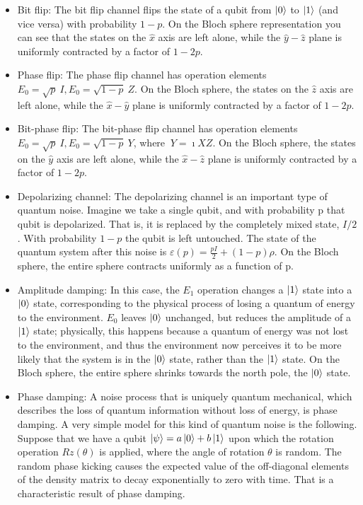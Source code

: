 \documentclass{article}
\begin{document}
	\begin{itemize}
        \item Bit ﬂip: The bit ﬂip channel ﬂips the state of a qubit from $\ket{0}$ to $\ket{1}$ (and vice versa) with probability $1 - p$. On the Bloch sphere representation you can see that the states on the $\hat{x}$ axis are left alone, while the $\hat{y}-\hat{z}$ plane is uniformly contracted by a factor of $1 - 2p$. 
        
        \item Phase flip: The phase ﬂip channel has operation elements $E_0 = \sqrt{p}\ I , E_0 = \sqrt{1 - p}\ Z $. On the Bloch sphere, the states on the $\hat{z}$ axis  are left alone, while the  $\hat{x}-\hat{y}$ plane is uniformly contracted by a factor of $1 - 2p$.

        \item Bit-phase flip: The bit-phase ﬂip channel has operation elements $E_0 = \sqrt{p}\ I , E_0 = \sqrt{1 - p}\ Y$, where $\ Y = \imath X Z $. On the Bloch sphere, the states on the $\hat{y}$  axis are left alone, while the $\hat{x}-\hat{z}$ plane is uniformly contracted by a factor of $1 - 2p$.

        \item Depolarizing channel: The depolarizing channel is an important type of quantum noise. Imagine we take a single qubit, and with probability p that qubit is depolarized. That is, it is replaced by the completely mixed state, $I/2$. With probability $1 - p$ the qubit is left untouched. The state of the quantum system after this noise is  $\varepsilon (p) = \frac{pI}{2} + (1- p)\rho$. On the Bloch sphere, the entire sphere contracts uniformly as a function of p. \cite{quantccompquantinfo}
        
        \item Amplitude damping: In this case, the $E_1$ operation changes a $\ket{1}$ state into a $\ket{0}$ state, corresponding to the physical process of losing a quantum of energy to the environment. $E_0$ leaves $\ket{0}$ unchanged, but reduces the amplitude of a $\ket{1}$ state; physically, this happens because a quantum of energy was not lost to the environment, and thus the environment now perceives it to be more likely that the system is in the $\ket{0}$ state, rather than the $\ket{1}$ state. On the Bloch sphere, the entire sphere shrinks towards the north pole, the $\ket{0}$ state. \cite{quantccompquantinfo}
        
        \item Phase damping: A noise process that is uniquely quantum mechanical, which describes the loss of quantum information without loss of energy, is phase damping. A very simple model for this kind of quantum noise is the following. Suppose that we have a qubit $\ket{\psi} = a \ket{0} + b \ket{1}$ upon which the rotation operation $Rz (\theta)$ is applied, where the angle of rotation $\theta$ is random. The random phase kicking causes the expected value of the off-diagonal elements of the density matrix to decay exponentially to zero with time. That is a characteristic result of phase damping. \cite{quantccompquantinfo}
    
	\end{itemize}
\end{document}
